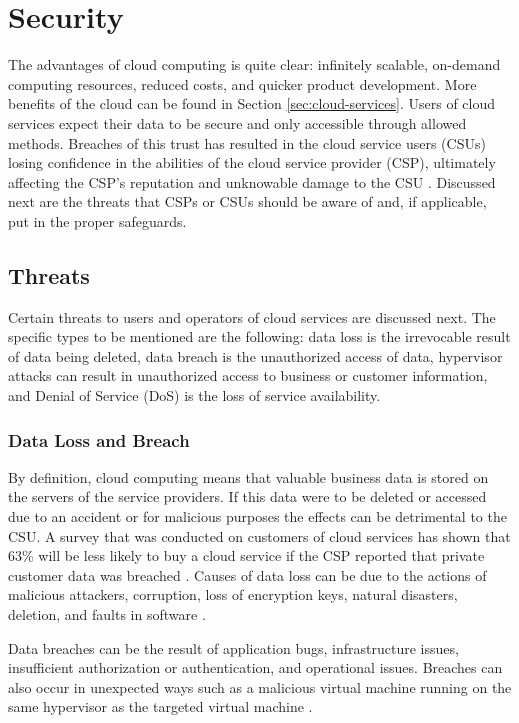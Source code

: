 \documentclass[12pt]{article}
\begin{document}
\section{Security} \label{sec:security}

The advantages of cloud computing is quite clear: infinitely scalable, on-demand computing resources, reduced costs, and quicker product development. More benefits of the cloud can be found in Section \ref{sec:cloud-services}. Users of cloud services expect their data to be secure and only accessible through allowed methods. Breaches of this trust has resulted in the cloud service users (CSUs) losing confidence in the abilities of the cloud service provider (CSP), ultimately affecting the CSP's reputation and unknowable damage to the CSU \cite{kazim2015survey}. Discussed next are the threats that CSPs or CSUs should be aware of and, if applicable, put in the proper safeguards.

\subsection{Threats}

Certain threats to users and operators of cloud services are discussed next. The specific types to be mentioned are the following: data loss is the irrevocable result of data being deleted, data breach is the unauthorized access of data, hypervisor attacks can result in unauthorized access to business or customer information, and Denial of Service (DoS) is the loss of service availability.



\subsubsection{Data Loss and Breach}

By definition, cloud computing means that valuable business data is stored on the servers of the service providers. If this data were to be deleted or accessed due to an accident or for malicious purposes the effects can be detrimental to the CSU. A survey that was conducted on customers of cloud services has shown that 63\% will be less likely to buy a cloud service if the CSP reported that private customer data was breached \cite{microsoftdata}. Causes of data loss can be due to the actions of malicious attackers, corruption, loss of encryption keys, natural disasters, deletion, and faults in software \cite{kazim2015survey}.

Data breaches can be the result of application bugs, infrastructure issues, insufficient authorization or authentication, and operational issues. Breaches can also occur in unexpected ways such as a malicious virtual machine running on the same hypervisor as the targeted virtual machine \cite{zhang2012cross}.
\end{document}
